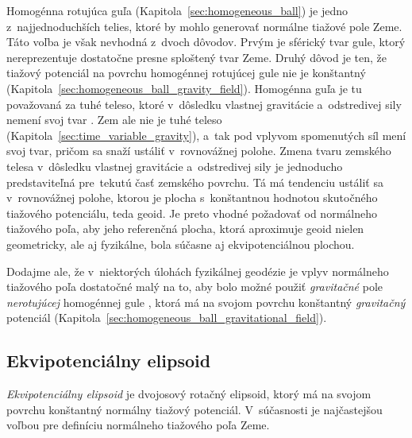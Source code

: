 \documentclass[a4paper, 12pt]{book}
\begin{document}
Homogénna rotujúca guľa (Kapitola~\ref{sec:homogeneous_ball}) je jedno 
z~najjednoduchších telies, ktoré by mohlo generovať normálne tiažové pole Zeme.  
Táto voľba je však nevhodná z~dvoch dôvodov.  Prvým je sférický tvar gule, 
ktorý nereprezentuje dostatočne presne sploštený tvar Zeme.  Druhý dôvod je 
ten, že tiažový potenciál na povrchu homogénnej rotujúcej gule nie je 
konštantný (Kapitola~\ref{sec:homogeneous_ball_gravity_field}).  Homogénna guľa 
je tu považovaná za tuhé teleso, ktoré v~dôsledku vlastnej gravitácie 
a~odstredivej sily nemení svoj tvar \parencite{SansoGeoidDetermination}.  Zem 
ale nie je tuhé teleso (Kapitola~\ref{sec:time_variable_gravity}), a~tak pod 
vplyvom spomenutých síl mení svoj tvar, pričom sa snaží ustáliť v~rovnovážnej 
polohe.  Zmena tvaru zemského telesa v~dôsledku vlastnej gravitácie 
a~odstredivej sily je jednoducho predstaviteľná pre~tekutú časť zemského 
povrchu.  Tá má tendenciu ustáliť sa v~rovnovážnej polohe, ktorou je plocha 
s~konštantnou hodnotou skutočného tiažového potenciálu, teda geoid.  Je preto 
vhodné požadovať od normálneho tiažového poľa, aby jeho referenčná plocha, 
ktorá aproximuje geoid nielen geometricky, ale aj fyzikálne, bola súčasne aj 
ekvipotenciálnou plochou.

Dodajme ale, že v~niektorých úlohách fyzikálnej geodézie je vplyv normálneho 
tiažového poľa dostatočné malý na to, aby bolo možné použiť \emph{gravitačné} 
pole \emph{nerotujúcej} homogénnej gule \parencite{SansoGeoidDetermination}, 
ktorá má na svojom povrchu konštantný \emph{gravitačný} potenciál 
(Kapitola~\ref{sec:homogeneous_ball_gravitational_field}).

\subsection{Ekvipotenciálny elipsoid}
\label{sec:normal_field_equipotential_ellipsoid}

\emph{Ekvipotenciálny elipsoid} je dvojosový rotačný elipsoid, ktorý má na 
svojom povrchu konštantný normálny tiažový potenciál.  V~súčasnosti je 
najčastejšou voľbou pre definíciu normálneho tiažového poľa Zeme.
\end{document}
